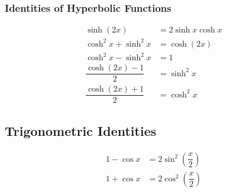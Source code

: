 \documentclass[fleqn, a5paper, 11pt]{article}
\theoremstyle{definition}
\theoremstyle{theorem}
\theoremstyle{remark}
\begin{document}
\subsubsection{Identities of Hyperbolic Functions}

\begin{align*}
	\sinh (2x) &= 2 \sinh x \cosh x \\
	\cosh ^2 x + \sinh ^2 x &= \cosh (2x) \\
	\cosh ^2 x - \sinh ^2 x &= 1 \\
	\dfrac{\cosh (2x) - 1}{2} &= \sinh ^2 x \\
	\dfrac{\cosh (2x) + 1}{2} &= \cosh ^2 x 
\end{align*}

\subsection{Trigonometric Identities}

\begin{align*}
	1 - \cos x &= 2 \sin^2 \left(\dfrac{x}{2}\right)\\
	1 + \cos x &= 2 \cos^2 \left(\dfrac{x}{2}\right)
\end{align*}

\end{document}
